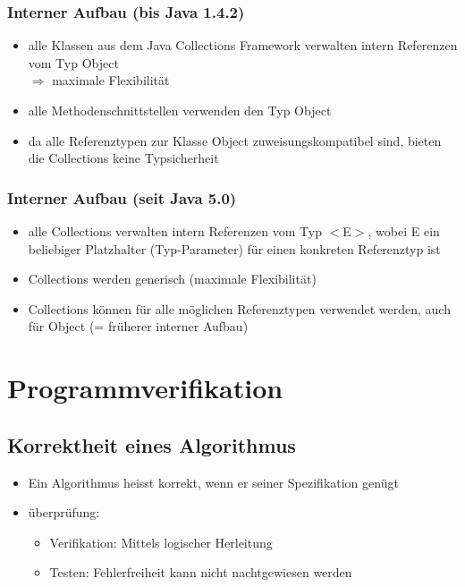 \documentclass[a4paper,10pt]{article}
\begin{document}
\subsubsection{Interner Aufbau (bis Java 1.4.2)}
\begin{itemize}
	\item alle Klassen aus dem Java Collections Framework verwalten intern Referenzen vom Typ Object \\ $\Rightarrow$ maximale Flexibilit\"at
	\item alle Methodenschnittstellen verwenden den Typ Object
	\item da alle Referenztypen zur Klasse Object zuweisungskompatibel sind, bieten die Collections keine Typsicherheit
\end{itemize}

\subsubsection{Interner Aufbau (seit Java 5.0)}
\begin{itemize}
	\item alle Collections verwalten intern Referenzen vom Typ $<$E$>$, wobei E ein beliebiger Platzhalter (Typ-Parameter) f\"ur einen konkreten Referenztyp ist
	\item Collections werden generisch (maximale Flexibilit\"at)
	\item Collections k\"onnen f\"ur alle m\"oglichen Referenztypen verwendet werden, auch
f\"ur Object (= fr\"uherer interner Aufbau)
\end{itemize}

\pagebreak
\section{Programmverifikation}
\subsection{Korrektheit eines Algorithmus}
\begin{itemize}
\item Ein Algorithmus heisst korrekt, wenn er seiner Spezifikation gen\"ugt
\item \"uberpr\"ufung:
	\begin{itemize}
	\item Verifikation: Mittels logischer Herleitung
	\item Testen: Fehlerfreiheit kann nicht nachtgewiesen werden
	\end{itemize}
\end{itemize}
\end{document}
